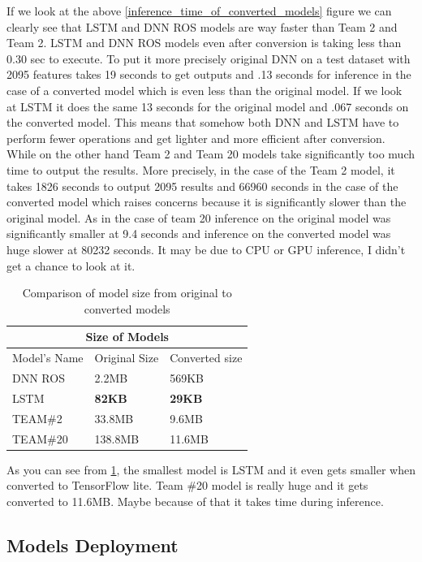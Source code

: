 If we look at the above \ref{inference_time_of_converted_models} figure we can clearly see that LSTM and DNN ROS models are way faster than Team 2 and Team 2. LSTM and DNN ROS models even after conversion is taking less than 0.30 sec to execute. To put it more precisely original DNN on a test dataset with 2095 features takes 19 seconds to get outputs and .13 seconds for inference in the case of a converted model which is even less than the original model. If we look at LSTM it does the same 13 seconds for the original model and .067 seconds on the converted model. This means that somehow both DNN and LSTM have to perform fewer operations and get lighter and more efficient after conversion. While on the other hand Team 2 and Team 20 models take significantly too much time to output the results. More precisely, in the case of the Team 2 model, it takes 1826 seconds to output 2095 results and 66960 seconds in the case of the converted model which raises concerns because it is significantly slower than the original model. As in the case of team 20 inference on the original model was significantly smaller at 9.4 seconds and inference on the converted model was huge slower at 80232 seconds. It may be due to CPU or GPU inference, I didn't get a chance to look at it. 

\begin{table}
\centering
\begin{tabular}{ |p{5cm}||p{3cm}|p{3cm}|}
 \hline
 \multicolumn{3}{|c|}{Size of Models} \\
 \hline
 Model's Name& Original Size&Converted size\\
 \hline
 DNN ROS   & 2.2MB   &   569KB\\
 LSTM&  \textbf{82KB}   & \textbf{29KB} \\
 TEAM\#2 &33.8MB & 9.6MB\\
 TEAM\#20  & 138.8MB & 11.6MB\\
 \hline
\end{tabular}
 \caption{\label{tab:models_size_after_conversion}Comparison of model size from original to converted models}
 \end{table}
 
 As you can see from \ref{tab:models_size_after_conversion}, the smallest model is LSTM and it even gets smaller when converted to TensorFlow lite. Team \#20 model is really huge and it gets converted to 11.6MB. Maybe because of that it takes time during inference. 
 
\subsection{Models Deployment}\label{modelsdeployment}

